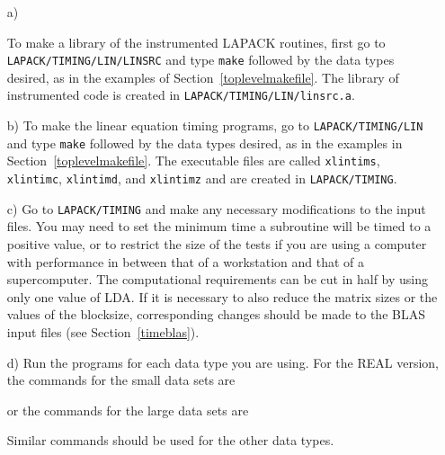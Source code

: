 \documentclass[11pt]{report}
\begin{document}
\begin{itemize}
\item[a)]
\begin{sloppypar}
To make a library of the instrumented LAPACK routines, first
go to \texttt{LAPACK/TIMING/LIN/LINSRC} and type \texttt{make} followed
by the data types desired, as in the examples of Section~\ref{toplevelmakefile}.
The library of instrumented code is created in
\texttt{LAPACK/TIMING/LIN/linsrc.a}.
\end{sloppypar}

\item[b)]
To make the linear equation timing programs,
go to \texttt{LAPACK/TIMING/LIN} and type \texttt{make} followed by the data
types desired, as in the examples in Section~\ref{toplevelmakefile}.
The executable files are called \texttt{xlintims},
\texttt{xlintimc}, \texttt{xlintimd}, and \texttt{xlintimz} and are created
in \texttt{LAPACK/TIMING}.

\item[c)]
Go to \texttt{LAPACK/TIMING} and
make any necessary modifications to the input files.
You may need to set the minimum time a subroutine will
be timed to a positive value, or to restrict the size of the tests
if you are using a computer with performance in between that of a
workstation and that of a supercomputer.
The computational requirements can be cut in half by using only one
value of LDA.
If it is necessary to also reduce the matrix sizes or the values of
the blocksize, corresponding changes should be made to the
BLAS input files (see Section~\ref{timeblas}).

\item[d)]
Run the programs for each data type you are using.
For the REAL version, the commands for the small data sets are

or the commands for the large data sets are

\noindent
Similar commands should be used for the other data types.
\end{itemize}
\end{document}
